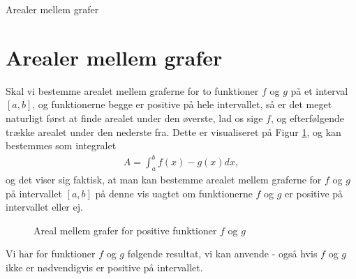 \begin{center}
\Huge
Arealer mellem grafer
\end{center}

\section*{Arealer mellem grafer}

Skal vi bestemme arealet mellem graferne for to funktioner $f$ og $g$ på et interval $[a,b]$, og funktionerne begge er positive på hele intervallet, så er det meget naturligt først at finde arealet under den øverste, lad os sige $f$, og efterfølgende trække arealet under den nederste fra. Dette er visualiseret på Figur \ref{fig:arealmellemgrafer}, og kan bestemmes som integralet
\begin{align*}
	A = \int_a^b f(x) - g(x) dx,
\end{align*}
og det viser sig faktisk, at man kan bestemme arealet mellem graferne for $f$ og $g$ på intervallet $[a,b]$ på denne vis 
uagtet om funktionerne $f$ og $g$ er positive på intervallet eller ej. 
\begin{figure}[H]
	\centering
	\caption{Areal mellem grafer for positive funktioner $f$ og $g$}
	\label{fig:arealmellemgrafer}
\end{figure}
Vi har for funktioner $f$ og $g$ følgende resultat, vi kan anvende - også hvis $f$ og $g$ ikke er nødvendigvis er positive på intervallet.
